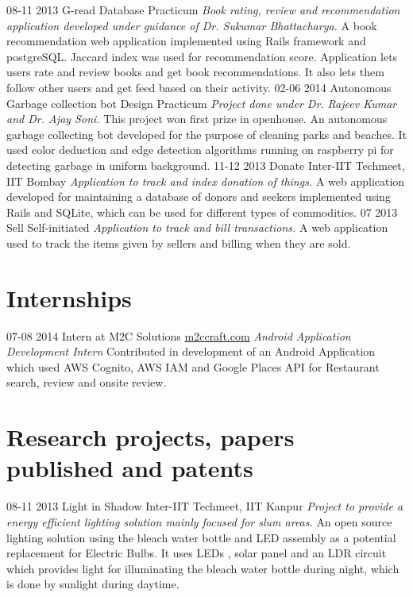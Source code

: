 \documentclass[]{friggeri-cv}
\begin{document}
\begin{entrylist}
  \projectentry
    {08-11 2013}
    {G-read}
    {Database Practicum}
    {\emph{Book rating, review and recommendation application developed under guidance of Dr. Sukumar Bhattacharya.}}
    {A book recommendation web application implemented using Rails framework and postgreSQL. Jaccard index was used for recommendation score. Application lets users rate and review books and get book recommendations. It also lets them follow other users and get feed based on their activity.}
  \projectentry
    {02-06 2014}
    {Autonomous Garbage collection bot}
    {Design Practicum}
    {\emph{Project done under Dr. Rajeev Kumar and Dr. Ajay Soni.}}
    {This project won first prize in openhouse. An autonomous garbage collecting bot developed for the purpose of cleaning parks and beaches. It used color deduction and edge detection algorithms running on raspberry pi for detecting garbage in uniform background.}
  \projectentry
    {11-12 2013}
    {Donate}
    {Inter-IIT Techmeet, IIT Bombay}
    {\emph{Application to track and index donation of things.}}
    {A web application developed for maintaining a database of donors and seekers implemented using Rails and SQLite, which can be used for different types of commodities.}
  \projectentry
  	{07 2013}
  	{Sell}
  	{Self-initiated}
  	{\emph{Application to track and bill transactions.}}
  	{A web application used to track the items given by sellers and billing when they are sold.}    
\end{entrylist}

\section{Internships}
\begin{entrylist}
  \internentry
    {07-08 2014}
    {Intern at M2C Solutions}
    {\href{http://m2ccraft.com/}{m2ccraft.com}}
    {\emph{Android Application Development Intern}}
    {Contributed in development of an Android Application which used AWS Cognito, AWS IAM and Google Places API for Restaurant search, review and onsite review.}
\end{entrylist}

\section{Research projects, papers published and patents}
\begin{entrylist}
  \projectentry
    {08-11 2013}
    {Light in Shadow}
    {Inter-IIT Techmeet, IIT Kanpur}
    {\emph{Project to provide a energy efficient lighting solution mainly focused for slum areas.}}
    {An open source lighting solution using the bleach water bottle and LED assembly as a potential  replacement for Electric Bulbs. It uses LEDs , solar panel and an LDR circuit which provides light for illuminating the bleach water bottle during night, which is done by sunlight during daytime.}
\end{entrylist}
\end{document}

